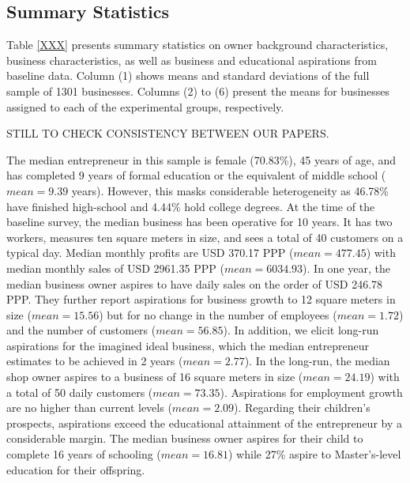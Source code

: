 \documentclass[11.5pt]{article}
\begin{document}
\subsection{Summary Statistics}

Table \ref{XXX} presents summary statistics on owner background characteristics, business characteristics, as well as business and educational aspirations from baseline data. Column (1) shows means and standard deviations of the full sample of 1301 businesses. Columns (2) to (6) present the means for businesses assigned to each of the experimental groups, respectively.

\textcolor[rgb]{1.00,0.00,0.00}{STILL TO CHECK CONSISTENCY BETWEEN OUR PAPERS.}

The median entrepreneur in this sample is female (70.83\%), 45 years of age, and has completed 9 years of formal education or the equivalent of middle school ($mean = 9.39$ years). However, this masks considerable heterogeneity as 46.78\% have finished high-school and 4.44\% hold college degrees. At the time of the baseline survey, the median business has been operative for 10 years. It has two workers, measures ten square meters in size, and sees a total of 40 customers on a typical day. Median monthly profits are USD 370.17 PPP ($mean = 477.45$) with median monthly sales of USD 2961.35 PPP ($mean = 6034.93$). In one year, the median business owner aspires to have daily sales on the order of USD 246.78 PPP. They further report aspirations for business growth to 12 square meters in size ($mean = 15.56$) but for no change in the number of employees ($mean = 1.72$) and the number of customers ($mean = 56.85$). In addition, we elicit long-run aspirations for the imagined ideal business, which the median entrepreneur estimates to be achieved in 2 years ($mean = 2.77$). In the long-run, the median shop owner aspires to a business of 16 square meters in size ($mean = 24.19$) with a total of 50 daily customers ($mean = 73.35$). Aspirations for employment growth are no higher than current levels ($mean = 2.09$). Regarding their children's prospects, aspirations exceed the educational attainment of the entrepreneur by a considerable margin. The median business owner aspires for their child to complete 16 years of schooling ($mean = 16.81$) while 27\% aspire to Master's-level education for their offspring. %
\end{document}
